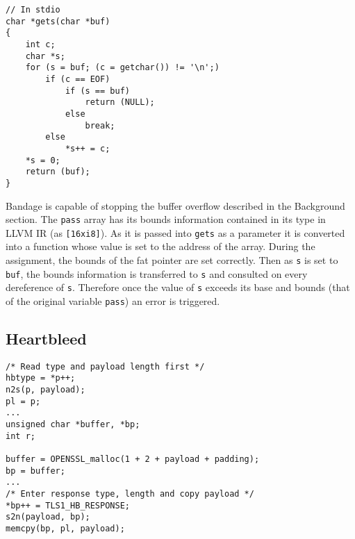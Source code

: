\begin{verbatim}
// In stdio
char *gets(char *buf)
{
    int c;
    char *s;
    for (s = buf; (c = getchar()) != '\n';)
        if (c == EOF)
            if (s == buf)
                return (NULL);
            else
                break;
        else
            *s++ = c;
    *s = 0;
    return (buf);
}
\end{verbatim}
Bandage is capable of stopping the buffer overflow described in the Background section.
The \verb!pass! array has its bounds information contained in its type in LLVM IR (as \verb![16xi8]!).
As it is passed into \verb!gets! as a parameter it is converted into a function whose value is set to the address of the array.
During the assignment, the bounds of the fat pointer are set correctly.
Then as \verb!s! is set to \verb!buf!, the bounds information is transferred to \verb!s! and consulted on every dereference of \verb!s!.
Therefore once the value of \verb!s! exceeds its base and bounds (that of the original variable \verb!pass!) an error is triggered.

\subsection{Heartbleed}

\begin{verbatim}
/* Read type and payload length first */
hbtype = *p++;
n2s(p, payload);
pl = p;
...
unsigned char *buffer, *bp;
int r;

buffer = OPENSSL_malloc(1 + 2 + payload + padding);
bp = buffer;
...
/* Enter response type, length and copy payload */
*bp++ = TLS1_HB_RESPONSE;
s2n(payload, bp);
memcpy(bp, pl, payload);
\end{verbatim}




